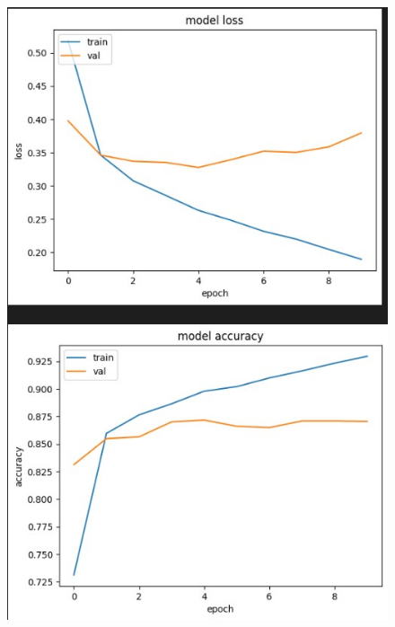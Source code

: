 \documentclass{article}
\begin{document}
\begin{figure}[!h]
    \centering\includegraphics[scale=.65]{./LSTM-[16]-[64, 16, 16]}
    \caption{}\label{fig.42}
\end{figure}
\end{document}
